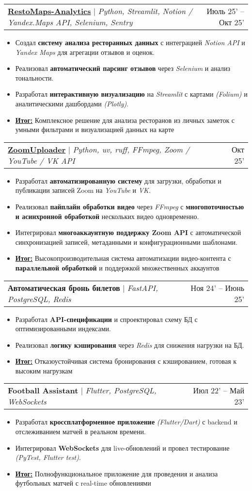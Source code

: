 \documentclass[letterpaper,11pt]{article}
\makeatletter
\newcommand{\resumeItem}[1]{
  \item\small{
    {#1 \vspace{-2pt}}
  }
}
\newcommand{\resumeProjectHeading}[2]{
    \item
    \begin{tabular*}{0.97\textwidth}{l@{\extracolsep{\fill}}r}
      \small#1 & #2 \\
    \end{tabular*}\vspace{-7pt}
}
\newcommand{\resumeItemListStart}{\begin{itemize}}
\newcommand{\resumeItemListEnd}{\end{itemize}\vspace{-5pt}}
\makeatother
\begin{document}
    \resumeProjectHeading
    {\href{https://github.com/GordeyZuev/RestoMaps-Analytics}{\textcolor{blue!50!black}{\textbf{RestoMaps-Analytics}}} $|$ \emph{Python, Streamlit, Notion / Yandex.Maps API, Selenium, Sentry}}{Июль 25' -- Окт 25'}
    \resumeItemListStart
        \resumeItem{Создал \textbf{систему анализа ресторанных данных} с интеграцией \textit{Notion API} и \textit{Yandex Maps} для агрегации отзывов и оценок.}
        \resumeItem{Реализовал \textbf{автоматический парсинг отзывов} через \textit{Selenium} и анализ тональности.}
        \resumeItem{Разработал \textbf{интерактивную визуализацию} на \textit{Streamlit} с картами \textit{(Folium)} и аналитическими дашбордами \textit{(Plotly)}.}
        \resumeItem{\underline{\textbf{Итог:}} Комплексное решение для анализа ресторанов из личных заметок с умными фильтрами и визуализацией данных на карте}
    \resumeItemListEnd

    \resumeProjectHeading
    {\href{https://github.com/GordeyZuev/ZoomUploader}{\textcolor{blue!50!black}{\textbf{ZoomUploader}}} $|$ \emph{Python, uv, ruff, FFmpeg, Zoom / YouTube / VK API}}{Окт 25'}
    \resumeItemListStart
        \resumeItem{Разработал \textbf{автоматизированную систему} для загрузки, обработки и публикации записей Zoom на \textit{YouTube} и \textit{VK}.}
        \resumeItem{Реализовал \textbf{пайплайн обработки видео} через \textit{FFmpeg} с \textbf{многопоточностью и асинхронной обработкой} нескольких видео одновременно.}
        \resumeItem{Интегрировал \textbf{многоаккаунтную поддержку Zoom API} с автоматической синхронизацией записей, метаданными и конфигурационными шаблонами.}
        \resumeItem{\underline{\textbf{Итог:}} Высокопроизводительная система автоматизации видео-контента с \textbf{параллельной обработкой} и поддержкой множественных аккаунтов}
    \resumeItemListEnd

    \resumeProjectHeading
    {\textbf{Автоматическая бронь билетов} $|$ \emph{FastAPI, PostgreSQL, Redis}}{Ноя 24' -- Июнь 25'}
    \resumeItemListStart
        \resumeItem{Разработал \textbf{API-спецификации} и спроектировал схему БД с оптимизированными индексами.}
        \resumeItem{Реализовал \textbf{логику кэширования} через \textit{Redis} для снижения нагрузки на БД.}
        \resumeItem{\underline{\textbf{Итог:}} Отказоустойчивая система бронирования с кэшированием, готовая к высоким нагрузкам}
    \resumeItemListEnd

    \resumeProjectHeading
    {\textbf{Football Assistant} $|$ \emph{Flutter, PostgreSQL, WebSockets}}{Июл 22' -- Май 23'}
    \resumeItemListStart
        \resumeItem{Разработал \textbf{кроссплатформенное приложение} \textit{(Flutter/Dart)} с backend и отслеживанием матчей в реальном времени.}
        \resumeItem{Интегрировал \textbf{WebSockets} для live-обновлений и провел тестирование \textit{(PyTest, Flutter test)}.}
        \resumeItem{\underline{\textbf{Итог:}} Полнофункциональное приложение для проведения и анализа футбольных матчей с real-time обновлениями}
    \resumeItemListEnd
\end{document}
